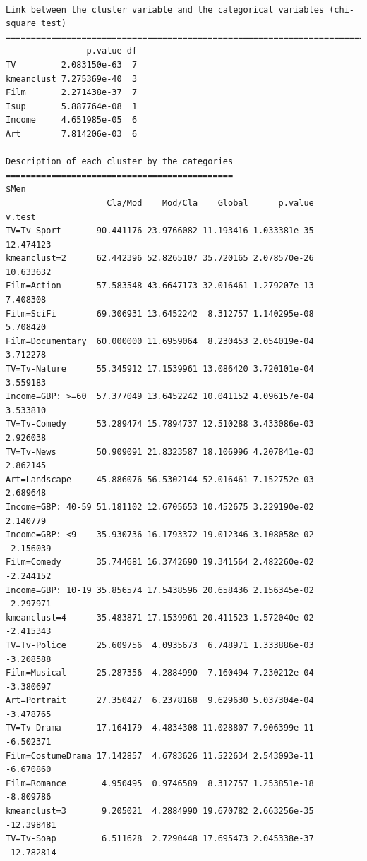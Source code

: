 \documentclass[
  letterpaper,
  DIV=11,
  numbers=noendperiod]{scrartcl}
\begin{document}
\begin{verbatim}

Link between the cluster variable and the categorical variables (chi-square test)
=================================================================================
                p.value df
TV         2.083150e-63  7
kmeanclust 7.275369e-40  3
Film       2.271438e-37  7
Isup       5.887764e-08  1
Income     4.651985e-05  6
Art        7.814206e-03  6

Description of each cluster by the categories
=============================================
$Men
                    Cla/Mod    Mod/Cla    Global      p.value     v.test
TV=Tv-Sport       90.441176 23.9766082 11.193416 1.033381e-35  12.474123
kmeanclust=2      62.442396 52.8265107 35.720165 2.078570e-26  10.633632
Film=Action       57.583548 43.6647173 32.016461 1.279207e-13   7.408308
Film=SciFi        69.306931 13.6452242  8.312757 1.140295e-08   5.708420
Film=Documentary  60.000000 11.6959064  8.230453 2.054019e-04   3.712278
TV=Tv-Nature      55.345912 17.1539961 13.086420 3.720101e-04   3.559183
Income=GBP: >=60  57.377049 13.6452242 10.041152 4.096157e-04   3.533810
TV=Tv-Comedy      53.289474 15.7894737 12.510288 3.433086e-03   2.926038
TV=Tv-News        50.909091 21.8323587 18.106996 4.207841e-03   2.862145
Art=Landscape     45.886076 56.5302144 52.016461 7.152752e-03   2.689648
Income=GBP: 40-59 51.181102 12.6705653 10.452675 3.229190e-02   2.140779
Income=GBP: <9    35.930736 16.1793372 19.012346 3.108058e-02  -2.156039
Film=Comedy       35.744681 16.3742690 19.341564 2.482260e-02  -2.244152
Income=GBP: 10-19 35.856574 17.5438596 20.658436 2.156345e-02  -2.297971
kmeanclust=4      35.483871 17.1539961 20.411523 1.572040e-02  -2.415343
TV=Tv-Police      25.609756  4.0935673  6.748971 1.333886e-03  -3.208588
Film=Musical      25.287356  4.2884990  7.160494 7.230212e-04  -3.380697
Art=Portrait      27.350427  6.2378168  9.629630 5.037304e-04  -3.478765
TV=Tv-Drama       17.164179  4.4834308 11.028807 7.906399e-11  -6.502371
Film=CostumeDrama 17.142857  4.6783626 11.522634 2.543093e-11  -6.670860
Film=Romance       4.950495  0.9746589  8.312757 1.253851e-18  -8.809786
kmeanclust=3       9.205021  4.2884990 19.670782 2.663256e-35 -12.398481
TV=Tv-Soap         6.511628  2.7290448 17.695473 2.045338e-37 -12.782814


\end{verbatim}
\end{document}

